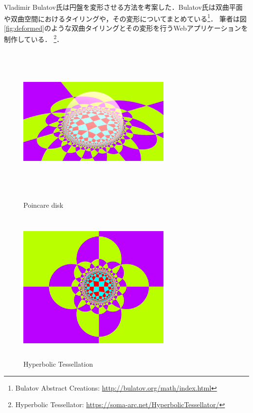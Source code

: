 Vladimir Bulatov氏は円盤を変形させる方法を考案した\cite{bending}．Bulatov氏は双曲平面や双曲空間におけるタイリングや，その変形についてまとめている\footnote{Bulatov Abstract Creations: \url{http://bulatov.org/math/index.html}}．
筆者は図\ref{fig:deformed}のような双曲タイリングとその変形を行うWebアプリケーションを制作している．
\footnote{Hyperbolic Tessellator: \url{https://soma-arc.net/HyperbolicTessellator/}}．


\begin{figure}[h!tbp]
 \begin{minipage}{0.49\hsize}
   \begin{center}
    \includegraphics[width=3in, height=3in, keepaspectratio]{../img/tessellation/poincare.pdf}
    \caption{Poincare disk}
    \label{fig:poincare}
   \end{center}
 \end{minipage}
 \hspace*{\fill}
 \begin{minipage}{0.49\hsize}
   \begin{center}
    \includegraphics[width=3in, height=3in, keepaspectratio]{../img/tessellation/outer.pdf}
    \caption{Hyperbolic Tessellation}
    \label{fig:outer}
   \end{center}
 \end{minipage}
\end{figure}


